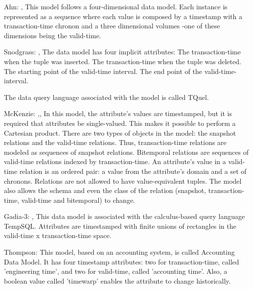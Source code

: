 Ahn: \cite{Snodgrass:1985:TTD:318898.318921},\cite{sno86} This model follows a four-dimensional data model. Each instance is represented as a sequence where each value is composed by a timestamp with a transaction-time chronon and a three dimensional volumes -one of these dimensions being the valid-time.

Snodgrass:  \cite{sno86},\cite{Snodgrass:1984:TQL:588011.588041} The data model has four implicit attributes: 
The transaction-time when the tuple was inserted.
The transaction-time when the tuple was deleted.
The starting point of the valid-time interval.
The end point of the valid-time-interval.
	
	The data query language associated with the model is called TQuel.

McKenzie: \cite{Snodgrass:1993:ATQ:642875.642890},\cite{Mckenzie:1988:ALQ:915060}, \cite{mck81} In this model, the attribute's values are timestamped, but it is required that attributes be single-valued. This makes it possible to perform a Cartesian product. There are two types of objects in the model: the snapshot relations and the valid-time relations. Thus, transaction-time relations are modeled as sequences of snapshot relations. Bitemporal relations are sequences of valid-time relations indexed by transaction-time. An attribute's value in a valid-time relation is an ordered pair: a value from the attribute's domain and a set of chronons. Relations are not allowed to have value-equivalent tuples. The model also allows the schema and even the class of the relation (snapshot, transaction-time, valid-time and bitemporal) to change.

Gadia-3: \cite{Bhargava:1993:RDS:642811.642819},\cite{gad92} This data model is associated with the calculus-based query language TempSQL. Attributes are timestamped with finite unions of rectangles in the valid-time x transaction-time space.

Thompson: \cite{171833} This model, based on an accounting system, is called Accounting Data Model. It has four timestamp attributes: two for transaction-time, called 'engineering time', and two for valid-time, called 'accounting time'. Also, a boolean value called 'timewarp' enables the attribute to change historically. 

